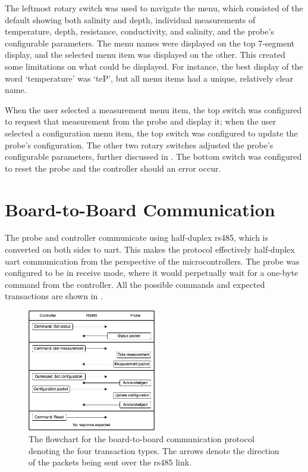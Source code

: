 The leftmost rotary switch was used to navigate the menu, which consisted of the default showing both salinity and depth, individual measurements of temperature, depth, resistance, conductivity, and salinity, and the probe's configurable parameters.
The menu names were displayed on the top 7-segment display, and the selected menu item was displayed on the other.
This created some limitations on what could be displayed. 
For instance, the best display of the word `temperature' was `teP', but all menu items had a unique, relatively clear name.

When the user selected a measurement menu item, the top switch was configured to request that measurement from the probe and display it; when the user selected a configuration menu item, the top switch was configured to update the probe's configuration.
The other two rotary switches adjusted the probe's configurable parameters, further discussed in .
The bottom switch was configured to reset the probe and the controller should an error occur.

\section{Board-to-Board Communication}\label{sec:board-to-board-communication}

The probe and controller communicate using half-duplex \gls{rs485}, which is converted on both sides to \gls{uart}.
This makes the protocol effectively half-duplex \gls{uart} communication from the perspective of the microcontrollers.
The probe was configured to be in receive mode, where it would perpetually wait for a one-byte command from the controller.
All the possible commands and expected transactions are shown in .

\begin{figure}[ht]
    \centering
    \includegraphics[width=0.5\textwidth]{Figures/rs485_flowchart}
    \caption{The flowchart for the board-to-board communication protocol denoting the four transaction types. The arrows denote the direction of the packets being sent over the \gls{rs485} link.}
    \label{fig:rs485-flowchart} %
\end{figure}

